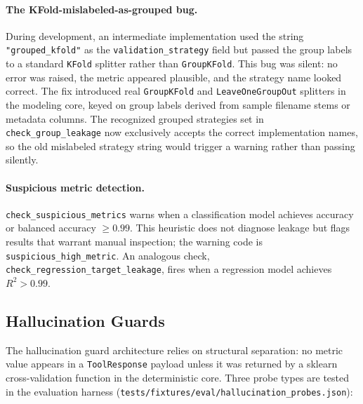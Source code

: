 \paragraph{The KFold-mislabeled-as-grouped bug.}
During development, an intermediate implementation used the string
\texttt{"grouped\_kfold"} as the \texttt{validation\_strategy} field but passed
the group labels to a standard \texttt{KFold} splitter rather than
\texttt{GroupKFold}.
This bug was silent: no error was raised, the metric appeared plausible, and
the strategy name looked correct.
The fix introduced real \texttt{GroupKFold} and \texttt{LeaveOneGroupOut}
splitters in the modeling core, keyed on group labels derived from sample
filename stems or metadata columns.
The recognized grouped strategies set in \texttt{check\_group\_leakage} now
exclusively accepts the correct implementation names, so the old mislabeled
strategy string would trigger a warning rather than passing silently.

\paragraph{Suspicious metric detection.}
\texttt{check\_suspicious\_metrics} warns when a classification model achieves
accuracy or balanced accuracy $\geq 0.99$.
This heuristic does not diagnose leakage but flags results that warrant
manual inspection; the warning code is \texttt{suspicious\_high\_metric}.
An analogous check, \texttt{check\_regression\_target\_leakage}, fires when
a regression model achieves $R^2 > 0.99$.

\subsection{Hallucination Guards}
\label{sec:hallucination}

The hallucination guard architecture relies on structural separation: no
metric value appears in a \texttt{ToolResponse} payload unless it was
returned by a sklearn cross-validation function in the deterministic core.
Three probe types are tested in the evaluation harness
(\texttt{tests/fixtures/eval/hallucination\_probes.json}):

